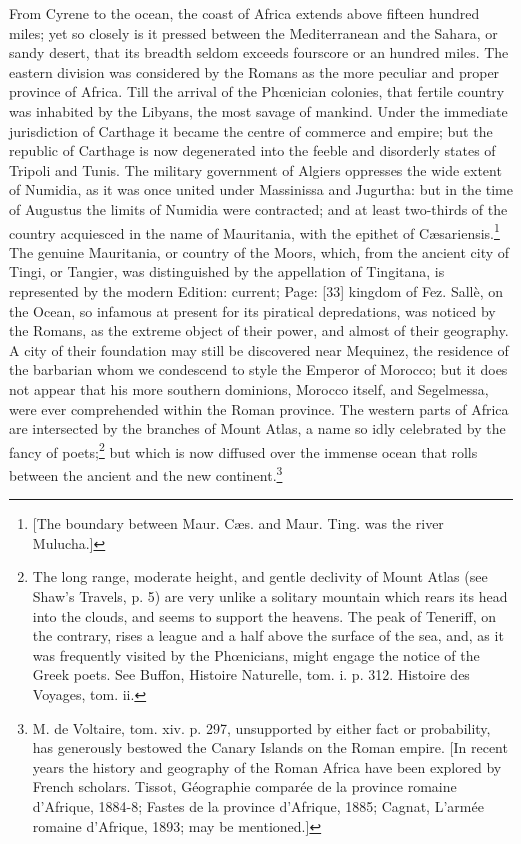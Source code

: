 From Cyrene to the ocean, the coast of Africa extends above fifteen hundred miles; yet so closely is it pressed between the Mediterranean and the Sahara, or sandy desert, that its breadth seldom exceeds fourscore or an hundred miles. The eastern division was considered by the Romans as the more peculiar and proper province of Africa. Till the arrival of the Phœnician colonies, that fertile country was inhabited by the Libyans, the most savage of mankind. Under the immediate jurisdiction of Carthage it became the centre of commerce and empire; but the republic of Carthage is now degenerated into the feeble and disorderly states of Tripoli and Tunis. The military government of Algiers oppresses the wide extent of Numidia, as it was once united under Massinissa and Jugurtha: but in the time of Augustus the limits of Numidia were contracted; and at least two-thirds of the country acquiesced in the name of Mauritania, with the epithet of Cæsariensis.\footnote{[The boundary between Maur. Cæs. and Maur. Ting. was the river Mulucha.]} The genuine Mauritania, or country of the Moors, which, from the ancient city of Tingi, or Tangier, was distinguished by the appellation of Tingitana, is represented by the modern Edition: current; Page: [33] kingdom of Fez. Sallè, on the Ocean, so infamous at present for its piratical depredations, was noticed by the Romans, as the extreme object of their power, and almost of their geography. A city of their foundation may still be discovered near Mequinez, the residence of the barbarian whom we condescend to style the Emperor of Morocco; but it does not appear that his more southern dominions, Morocco itself, and Segelmessa, were ever comprehended within the Roman province. The western parts of Africa are intersected by the branches of Mount Atlas, a name so idly celebrated by the fancy of poets;\footnote{The long range, moderate height, and gentle declivity of Mount Atlas (see Shaw\texthebrew{}’s Travels, p. 5) are very unlike a solitary mountain which rears its head into the clouds, and seems to support the heavens. The peak of Teneriff, on the contrary, rises a league and a half above the surface of the sea, and, as it was frequently visited by the Phœnicians, might engage the notice of the Greek poets. See Buffon, Histoire Naturelle, tom. i. p. 312. Histoire des Voyages, tom. ii.} but which is now diffused over the immense ocean that rolls between the ancient and the new continent.\footnote{M. de Voltaire, tom. xiv. p. 297, unsupported by either fact or probability, has generously bestowed the Canary Islands on the Roman empire. [In recent years the history and geography of the Roman Africa have been explored by French scholars. Tissot, Géographie comparée de la province romaine d\texthebrew{}’Afrique, 1884-8; Fastes de la province d\texthebrew{}’Afrique, 1885; Cagnat, L\texthebrew{}’armée romaine d\texthebrew{}’Afrique, 1893; may be mentioned.]}

